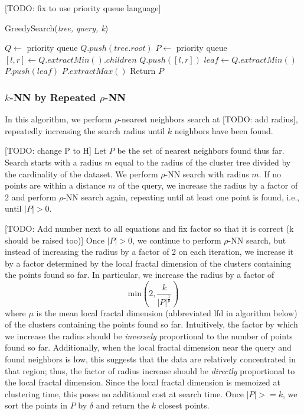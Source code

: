 [TODO: fix to use priority queue language]

\begin{algorithm} 
\caption{GreedySearch(\emph{tree, query, k})} 
\label{alg:greedy_search} 
\begin{algorithmic}[3]
    \STATE $Q \leftarrow$ priority queue
    \STATE $Q.push(tree.root)$
    \STATE $P \leftarrow$ priority queue
            \STATE $[l, r] \leftarrow Q.extractMin().children$
            \STATE $Q.push([l, r])$
        \ENDWHILE
        \STATE $leaf \leftarrow Q.extractMin()$
        \STATE $P.push(leaf)$
            \STATE $P.extractMax()$
        \ENDWHILE
    \ENDWHILE
    \STATE Return $P$
\end{algorithmic}
\end{algorithm}


\subsubsection{$k$-NN by Repeated $\rho$-NN}
\label{subsubsec:methods:knn-search:repeated-rnn}
In this algorithm, we perform
$\rho$-nearest neighbors search at [TODO: add radius], repeatedly increasing the search radius until $k$ neighbors
have been found.

[TODO: change P to H]
Let $P$ be the set of nearest neighbors found thus far.
Search starts with a radius $m$ equal to the radius of the cluster tree divided by
the cardinality of the dataset. We perform $\rho$-NN search with radius $m$. 
If no points are within a distance $m$ of the query, we increase the radius by a factor of 
2 and perform $\rho$-NN search again, repeating until at least one point is found, i.e., 
until $|P| > 0$.


[TODO: Add number next to all equations and fix factor so that it is correct (k should be raised too)]
Once $|P| > 0$, we continue to perform $\rho$-NN search, but instead of 
increasing the radius by a factor of 2 on each iteration, we increase it by a factor determined 
by the local fractal dimension of the clusters containing the points found so far. In particular, 
we increase the radius by a factor of 
$$\text{min}\left(2, \frac{k}{|P|^{\frac{1}{\mu}}}\right)$$
where $\mu$ is the mean local fractal dimension (abbreviated lfd in algorithm below) of the clusters containing the points found so far.
Intuitively, the factor by which we increase the radius should be \emph{inversely} proportional to the number of points found so far. 
Additionally, when the local fractal dimension near the query and found neighbors is low, this suggests that the data 
are relatively concentrated in that region; thus, the factor of radius increase should be \emph{directly} proportional to the 
local fractal dimension. Since the local fractal dimension is memoized at clustering time, this poses no additional cost at search time.
Once $|P| >= k$, we sort the points in $P$ by $\delta$ and return the $k$ closest points.

